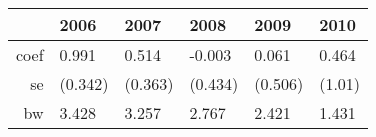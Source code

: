 \begin{table}[ht]
\centering
\begin{tabular}{rlllll}
  \hline
 & 2006 & 2007 & 2008 & 2009 & 2010 \\ 
  \hline
coef &  0.991 &  0.514 & -0.003 &  0.061 &  0.464 \\ 
  se & (0.342) & (0.363) & (0.434) & (0.506) & (1.01) \\ 
  bw & 3.428 & 3.257 & 2.767 & 2.421 & 1.431 \\ 
   \hline
\end{tabular}
\end{table}
